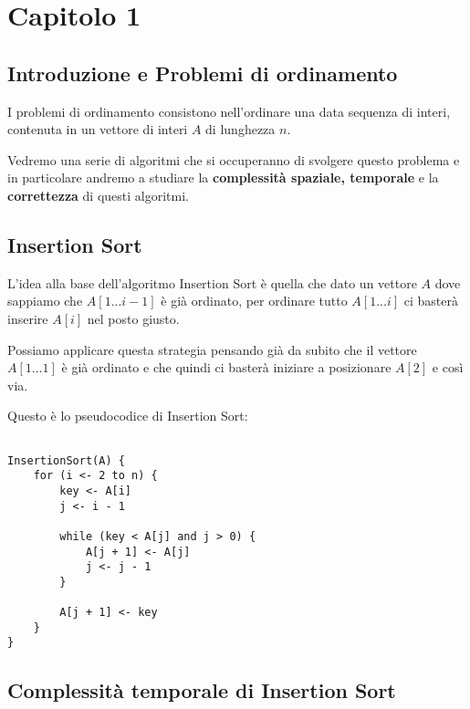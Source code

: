 \section{Capitolo 1}

\subsection{Introduzione e Problemi di ordinamento}

\begin{flushleft}

I problemi di ordinamento consistono nell'ordinare una data sequenza di interi, contenuta in un vettore
di interi $A$ di lunghezza $n$.

Vedremo una serie di algoritmi che si occuperanno di svolgere questo problema e in particolare andremo
a studiare la \textbf{complessità spaziale, temporale} e la \textbf{correttezza} di questi algoritmi.

\end{flushleft}

\subsection{Insertion Sort}

\begin{flushleft}

L'idea alla base dell'algoritmo Insertion Sort è quella che dato un vettore $A$ dove sappiamo che
$A[1 ... i-1]$ è già ordinato, per ordinare tutto $A[1...i]$ ci basterà inserire $A[i]$ nel posto giusto.

Possiamo applicare questa strategia pensando già da subito che il vettore $A[1 ... 1]$ è già ordinato
e che quindi ci basterà iniziare a posizionare $A[2]$ e così via.

\bigskip

Questo è lo pseudocodice di Insertion Sort:

\begin{lstlisting}

InsertionSort(A) {
	for (i <- 2 to n) {
		key <- A[i]
		j <- i - 1
		
		while (key < A[j] and j > 0) {
			A[j + 1] <- A[j]
			j <- j - 1
		}
		
		A[j + 1] <- key
	}
}

\end{lstlisting}
\end{flushleft}

\subsection{Complessità temporale di Insertion Sort}

